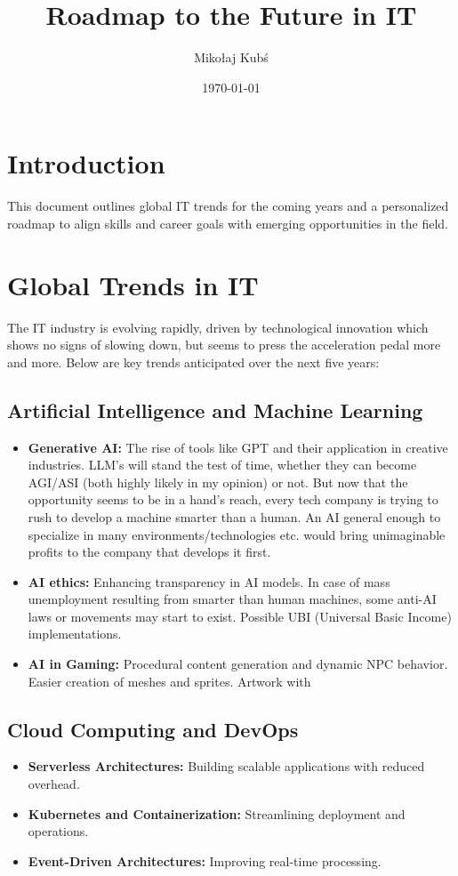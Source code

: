\documentclass{article}
\title{Roadmap to the Future in IT}
\author{Miko\l{}aj Kub\'s}
\date{\today}
\begin{document}
\maketitle

\section{Introduction}
This document outlines global IT trends for the coming years and a personalized roadmap to align skills and career goals with emerging opportunities in the field.

\section{Global Trends in IT}
The IT industry is evolving rapidly, driven by technological innovation which shows no signs of slowing down, but seems to press the acceleration pedal more and more. Below are key trends anticipated over the next five years:

\subsection{Artificial Intelligence and Machine Learning}
\begin{itemize}
    \item \textbf{Generative AI:} The rise of tools like GPT and their application in creative industries. LLM's will stand the test of time, whether they can become AGI/ASI (both highly likely in my opinion) or not. But now that the opportunity seems to be in a hand's reach, every tech company is trying to rush to develop a machine smarter than a human. An AI general enough to specialize in many environments/technologies etc. would bring unimaginable profits to the company that develops it first.
    \item \textbf{AI ethics:} Enhancing transparency in AI models. In case of mass unemployment resulting from smarter than human machines, some anti-AI laws or movements may start to exist. Possible UBI (Universal Basic Income) implementations.
    \item \textbf{AI in Gaming:} Procedural content generation and dynamic NPC behavior. Easier creation of meshes and sprites. Artwork with
\end{itemize}

\subsection{Cloud Computing and DevOps}
\begin{itemize}
    \item \textbf{Serverless Architectures:} Building scalable applications with reduced overhead.
    \item \textbf{Kubernetes and Containerization:} Streamlining deployment and operations.
    \item \textbf{Event-Driven Architectures:} Improving real-time processing.
\end{itemize}
\end{document}
